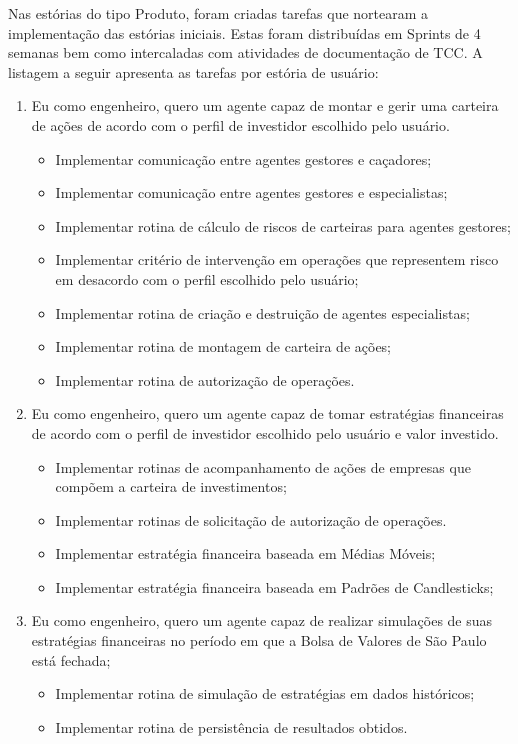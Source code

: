 Nas estórias do tipo Produto, foram criadas tarefas que nortearam a implementação das estórias iniciais. Estas foram distribuídas em Sprints de 4 semanas bem como intercaladas com atividades de documentação de TCC. A listagem a seguir apresenta as tarefas por estória de usuário: 

\begin{enumerate}
\item Eu como engenheiro, quero um agente capaz de montar e gerir uma carteira de ações de acordo com o perfil de investidor escolhido pelo usuário.
		\begin{itemize}
		\item Implementar comunicação entre agentes gestores e caçadores;
		\item Implementar comunicação entre agentes gestores e especialistas;
		\item Implementar rotina de cálculo de riscos de carteiras para agentes gestores;
		\item Implementar critério de intervenção em operações que representem risco em desacordo com o perfil escolhido pelo usuário;
		\item Implementar rotina de criação e destruição de agentes especialistas;
		\item Implementar rotina de montagem de carteira de ações;
		\item Implementar rotina de autorização de operações.
		\end{itemize}
\item Eu como engenheiro, quero um agente capaz de tomar estratégias financeiras de acordo com o perfil de investidor escolhido pelo usuário e valor investido.
		\begin{itemize}
		\item Implementar rotinas de acompanhamento de ações de empresas que compõem a carteira de investimentos;
		\item Implementar rotinas de solicitação de autorização de operações.
		\item Implementar estratégia financeira baseada em Médias Móveis;
		\item Implementar estratégia financeira baseada em Padrões de Candlesticks; 
		\end{itemize}
\item Eu como engenheiro, quero um agente capaz de realizar simulações de suas estratégias financeiras no período em que a Bolsa de Valores de São Paulo está fechada;
		\begin{itemize}
		\item Implementar rotina de simulação de estratégias em dados históricos;
		\item Implementar rotina de persistência de resultados obtidos.
		\end{itemize}


\end{enumerate}
